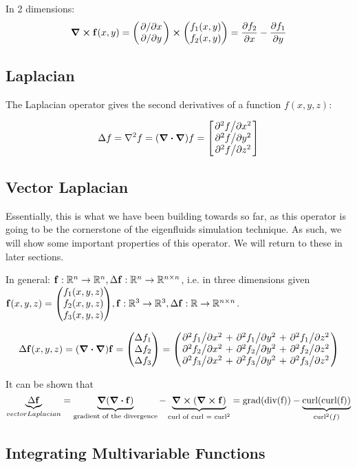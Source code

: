 In 2 dimensions:
$$\curl{\vb{f}(x,y)} = 
    \mqty(\pdv*{x} \\ \pdv*{y}) \cross 
    \mqty(f_1(x,y) \\ f_2(x,y))
    = \pdv{f_2}{x} - \pdv{f_1}{y}$$

\subsection{Laplacian}
The Laplacian operator gives the second derivatives of a function
$f(x,y,z)$:

$$\Delta f = \laplacian{f} = (\grad \vdot \grad)f 
= \mqty[\pdv*[2]{f}{x} \\ \pdv*[2]{f}{y} \\ \pdv*[2]{f}{z}]$$

\subsection{Vector Laplacian}
Essentially, this is what we have been building towards so far, as this operator
is going to be the cornerstone of the eigenfluids simulation
technique. As such, we will show some important
properties of this operator. We will return to these in later
sections.


In general: $\vb{f}: \mathbb{R}^n \to \mathbb{R}^n, \Delta\vb{f}:
\mathbb{R}^n\to\mathbb{R}^{n \times n}$, i.e. in three dimensions given
$\vb{f}(x,y,z) = \mqty(f_1(x,y,z)\\f_2(x,y,z)\\f_3(x,y,z)), \vb{f}:
\mathbb{R}^3\to\mathbb{R}^3, \Delta \vb{f}: \mathbb{R}\to\mathbb{R}^{n\times
n}$.

\begin{equation}
    \Delta\vb{f}(x, y, z) = (\grad\vdot\grad)\vb{f} = 
    \mqty(\Delta f_1 \\ \Delta f_2 \\ \Delta f_3) =
    \mqty(
        \pdv*[2]{f_1}{x} + \pdv*[2]{f_1}{y} + \pdv*[2]{f_1}{z}\\
        \pdv*[2]{f_2}{x} + \pdv*[2]{f_2}{y} + \pdv*[2]{f_2}{z}\\
        \pdv*[2]{f_3}{x} + \pdv*[2]{f_3}{y} + \pdv*[2]{f_3}{z}
    )
\end{equation}

It can be shown that
$$\underbrace{\Delta \vb{f}}_{vector Laplacian} = 
\underbrace{\grad(\div{\vb{f}})}_{\text{gradient of the divergence}} - 
\underbrace{\curl(\curl{\vb{f}})}_{\text{curl of curl = curl}^2} =
    \text{grad(div(f))} - \underbrace{\text{curl(curl(f))}}_{\text{curl}^2(f)}$$

\subsection{Integrating Multivariable Functions}


